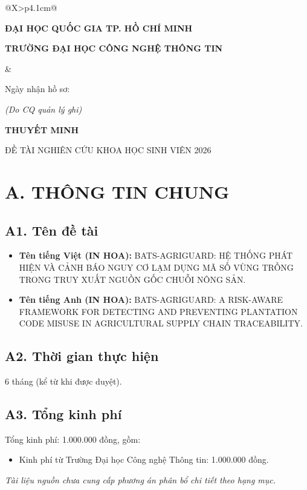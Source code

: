 \documentclass[letterpaper,11pt]{article}
\begin{document}
\begin{tabularx}{\textwidth}{@{}X>{\raggedleft\arraybackslash}p{4.1cm}@{}}
\begin{minipage}[t]{\linewidth}\centering
\textbf{ĐẠI HỌC QUỐC GIA TP. HỒ CHÍ MINH}\par
\textbf{TRƯỜNG ĐẠI HỌC CÔNG NGHỆ THÔNG TIN}
\end{minipage} &
\begin{minipage}[t]{\linewidth}\centering
Ngày nhận hồ sơ:\par\vspace{5pt}\textit{(Do CQ quản lý ghi)}
\end{minipage}
\end{tabularx}

\begin{center}
  \vspace{14pt}
  {\Large\bfseries THUYẾT MINH\par}
  \vspace{3pt}
  {\large ĐỀ TÀI NGHIÊN CỨU KHOA HỌC SINH VIÊN 2026\par}
\end{center}

\section*{A. THÔNG TIN CHUNG}

\subsection*{A1. Tên đề tài}
\begin{itemize}[label=-]
  \item \textbf{Tên tiếng Việt (IN HOA):} BATS-AGRIGUARD: HỆ THỐNG PHÁT HIỆN VÀ CẢNH BÁO NGUY CƠ LẠM DỤNG MÃ SỐ VÙNG TRỒNG TRONG TRUY XUẤT NGUỒN GỐC CHUỖI NÔNG SẢN.
  \item \textbf{Tên tiếng Anh (IN HOA):} BATS-AGRIGUARD: A RISK-AWARE FRAMEWORK FOR DETECTING AND PREVENTING PLANTATION CODE MISUSE IN AGRICULTURAL SUPPLY CHAIN TRACEABILITY.
\end{itemize}

\subsection*{A2. Thời gian thực hiện}
6 tháng (kể từ khi được duyệt).

\subsection*{A3. Tổng kinh phí}
Tổng kinh phí: 1.000.000 đồng, gồm:
\begin{itemize}
  \item Kinh phí từ Trường Đại học Công nghệ Thông tin: 1.000.000 đồng.
\end{itemize}
\textit{Tài liệu nguồn chưa cung cấp phương án phân bổ chi tiết theo hạng mục.}
\end{document}
